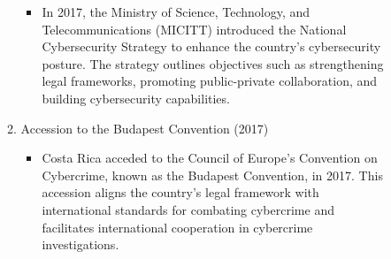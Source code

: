 \begin{enumerate}
\begin{description}
\begin{enumerate}[label=\arabic*., leftmargin=-0.5em]
\begin{itemize}
				\item In 2017, the Ministry of Science, Technology, and Telecommunications (MICITT) introduced the National Cybersecurity Strategy to enhance the country’s cybersecurity posture.
					The strategy outlines objectives such as strengthening legal frameworks, promoting public-private collaboration, and building cybersecurity capabilities.
			\end{itemize}
			\item Accession to the Budapest Convention (2017)
			\begin{itemize}
				\item Costa Rica acceded to the Council of Europe’s Convention on Cybercrime, known as the Budapest Convention, in 2017.
					This accession aligns the country’s legal framework with international standards for combating cybercrime and facilitates international cooperation in cybercrime investigations.
			\end{itemize}
        \end{enumerate}
    \end{description}


\end{enumerate}
